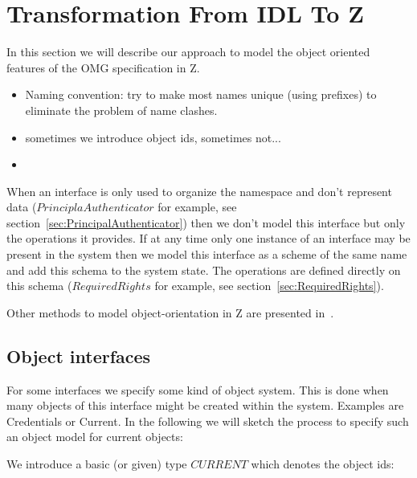 
\section{Transformation From IDL To Z} \label{sec:oo}

In this section we will describe our approach to model the object oriented
features of the OMG \corbasec specification in Z.

\begin{itemize}
\item Naming convention: try to make most names unique (using prefixes) to
  eliminate the problem of name clashes.
\item sometimes we introduce object ids, sometimes not...
\item 
\end{itemize}

When an interface is only used to organize the namespace and don't represent
data ($PrinciplaAuthenticator$ for example, see
section~\ref{sec:PrincipalAuthenticator}) then we don't model this interface but
only the operations it provides.  If at any time only one instance of an
interface may be present in the system then we model this interface as a scheme
of the same name and add this schema to the system state.  The operations are
defined directly on this schema ($RequiredRights$ for example, see
section~\ref{sec:RequiredRights}).

Other methods to model object-orientation in Z are presented
in~\cite{stepney:object:1990,smith:object:1999}.


\subsection{Object interfaces}


For some interfaces we specify some kind of object system.  This is done when
many objects of this interface might be created within the system.  Examples are
Credentials or Current.  In the following we will sketch the process to specify
such an object model for current objects:

We introduce a basic (or given) type $CURRENT$ which denotes the object ids:
\begin{zed}
  [CURRENT]
\end{zed}

